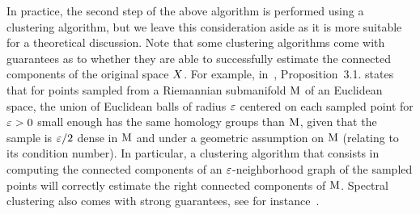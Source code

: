 In practice, the second step of the above algorithm is performed using a clustering algorithm, but we leave this consideration aside 
as it is more suitable for a theoretical discussion. Note that some clustering algorithms come with guarantees as to whether they are able to successfully estimate the connected components of the original space $X$. For example, in~\cite{niyogi2008finding}, Proposition~3.1. states that for points sampled from a Riemannian submanifold $\mathrm{M}$ of an Euclidean space, the union of Euclidean balls of radius $\varepsilon$ centered on each sampled point for $\varepsilon>0$ small enough has the same homology groups than $\mathrm{M}$, given that the sample is $\varepsilon/2$ dense in $\mathrm{M}$ and under a geometric assumption on $\mathrm{M}$ (relating to its condition number). In particular, a clustering algorithm that consists in computing the connected components of an $\varepsilon$-neighborhood graph of the sampled points will correctly estimate 
the right connected components of $\mathrm{M}$. Spectral clustering also comes with strong guarantees, see for instance~\cite{arias2011spectral}.  


